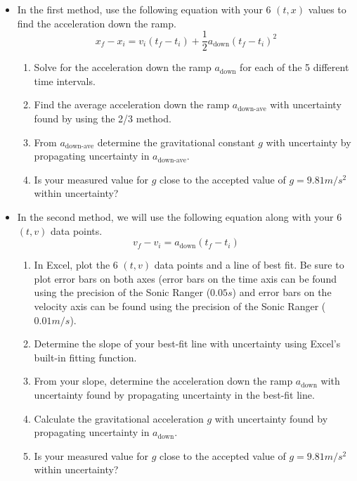 \begin{itemize}
\item{In the first method, use the following equation with your 6 $(t,x)$ values to find the acceleration down the ramp.
\begin{equation}
    x_f - x_i =   v_{i}(t_f - t_i) + \frac{1}{2}a_\text{down}(t_f  - t_i )^2
\end{equation}
\begin{enumerate}
\item Solve for the acceleration down the ramp $a_\text{down}$ for each of the 5 different time intervals.
\item  Find the average acceleration down the ramp $a_{\text{down-ave}}$ with uncertainty found by using the 2/3 method.
\item From $a_\text{down-ave}$ determine the gravitational constant $g$ with uncertainty by propagating uncertainty in $a_{\text{down-ave}}$.
\item Is your measured value for $g$ close to the accepted value of $g=9.81 m/s^2$ within uncertainty?
\end{enumerate}
}
\item{In the second method, we will use the following equation along with your 6 $(t,v)$ data points.
\begin{equation}
    v_f - v_{i} = a_\text{down} (t_f - t_i)
\end{equation}
\begin{enumerate}
\item In Excel, plot the 6 $(t,v)$ data points and a line of best fit. Be sure to plot error bars on both axes (error bars on the time axis can be found using the precision of the Sonic Ranger ($0.05 s$) and error bars on the velocity axis can be found using the precision of the Sonic Ranger ($0.01 m/s$).
\item Determine the slope of your best-fit line with uncertainty using Excel's built-in fitting function.
\item From your slope, determine the acceleration down the ramp $a_{\text{down}}$ with uncertainty found by propagating uncertainty in the best-fit line.
\item Calculate the gravitational acceleration $g$ with uncertainty found by propagating uncertainty in $a_\text{down}$.
\item Is your measured value for $g$ close to the accepted value of $g=9.81 m/s^2$ within uncertainty?
\end{enumerate}
}
\end{itemize}
